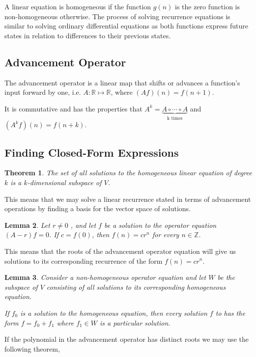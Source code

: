 \documentclass{article}
\newtheorem{theorem}{Theorem}[section]
\newtheorem{lemma}[theorem]{Lemma}
\begin{document}
A linear equation is homogeneous if the function $g(n)$ is the zero function is non-homogeneous otherwise. The process of solving recurrence equations is similar to solving ordinary differential equations as both functions express future states in relation to differences to their previous states.

\subsection{Advancement Operator}
The advancement operator is a linear map that shifts or advances a function's input forward by one, i.e. $A: \mathbb R \mapsto \mathbb R$, where $(Af)(n) = f(n+1)$. 

It is commutative and has the properties that $A^k =  \underbrace{A \circ \cdots \circ A }_\text{k times}$ and $(A^k f)(n) = f(n+k)$.

\subsection{Finding Closed-Form Expressions}
\begin{theorem}
The set of all solutions to the homogeneous linear equation of degree $k$ is a $k$-dimensional subspace of $V$.
\end{theorem}

This means that we may solve a linear recurrence stated in terms of advancement operations by finding a basis for the vector space of solutions.

\begin{lemma}
    Let $r \neq 0$ , and let $f$ be a solution to the operator equation $(A - r)f=0$. If $c=f(0)$, then $f(n)=c r^n$ for every $n \in \mathbb Z$.
\end{lemma}

This means that the roots of the advancement operator equation will give us solutions to its corresponding recurrence of the form $f(n) = c r^n$.


\begin{lemma}
Consider a non-homogeneous operator equation and let $W$ be the subspace of $V$ consisting of all solutions to its corresponding homogeneous equation.

If $f_0$ is a solution to the homogeneous equation, then every solution $f$ to has the form $f = f_0 + f_1$ where $f_1 \in W$ is a particular solution.
\end{lemma}

If the  polynomial in the advancement operator has distinct roots we may use the following theorem,
\end{document}
